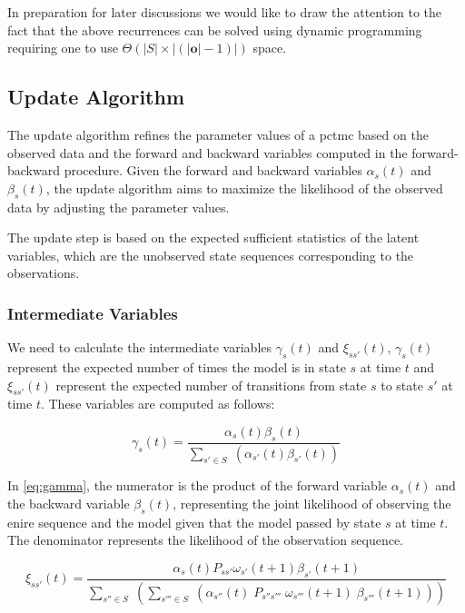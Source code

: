 In preparation for later discussions we would like to draw the attention to the fact that the above recurrences can be solved using dynamic programming requiring one to use $\Theta(|S|\times|(|\mathbf{o}|-1)|)$ space.


\subsection{Update Algorithm}\label{subsec:update-algorithm}
The update algorithm refines the parameter values of a \gls{pctmc} based on the observed data and the forward and backward variables computed in the forward-backward procedure.
Given the forward and backward variables $\alpha_s(t)$ and $\beta_s(t)$, the update algorithm aims to maximize the likelihood of the observed data by adjusting the parameter values.

The update step is based on the expected sufficient statistics of the latent variables, which are the unobserved state sequences corresponding to the observations.

\subsubsection{Intermediate Variables}
We need to calculate the intermediate variables $\gamma_s(t)$ and $\xi_{ss'}(t)$, $\gamma_s(t)$ represent the expected number of times the model is in state $s$ at time $t$ and $\xi_{ss'}(t)$ represent the expected number of transitions from state $s$ to state $s'$ at time $t$.
These variables are computed as follows:


\begin{equation}
    \gamma_s(t) = \frac{\alpha_s(t) \beta_s(t)}{\sum_{s' \in S} \;(\alpha_{s'}(t) \beta_{s'}(t))}
    \label{eq:gamma}
\end{equation}


In \autoref{eq:gamma}, the numerator is the product of the forward variable $\alpha_s(t)$ and the backward variable $\beta_s(t)$, representing the joint likelihood of observing the enire sequence and the model given that the model passed by state $s$ at time $t$.
The denominator represents the likelihood of the observation sequence.

\begin{equation}
    \xi_{ss'}(t) = \frac{\alpha_s(t) P_{ss'} \omega_{s'}(t + 1) \beta_{s'}(t + 1)}{\sum_{s'' \in S} \;(\sum_{s''' \in S} \; (\alpha_{s''}(t) \; P_{s''s'''} \; \omega_{s'''}(t + 1) \; \beta_{s'''}(t + 1)))}
    \label{eq:xi}
\end{equation}


